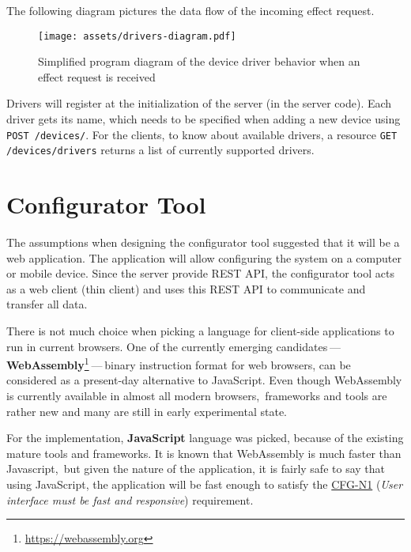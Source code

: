 The following diagram pictures the data flow of the incoming effect request.

\begin{figure}[h]{}
\centering\texttt{[image: assets/drivers-diagram.pdf]}
\caption{Simplified program diagram of the device driver behavior when an effect request is received}
\end{figure}

Drivers will register at the initialization of the server (in the server code).
Each driver gets its name, which needs to be specified when adding a new
device using \texttt{POST /devices/}. For the clients, to know about available
drivers, a resource \texttt{GET /devices/drivers} returns a list
of currently supported drivers.


\hypertarget{x-configurator-tool}{\section{Configurator Tool}}
The assumptions when designing the configurator tool suggested that it will
be a web application. The application will allow configuring the system
on a computer or mobile device. Since the server provide REST API,
the configurator tool acts as a
web client (thin client) and uses this REST API to communicate and transfer
all data.


There is not much choice when picking a language for client-side applications
to run in current browsers. One of the currently
emerging candidates — \textbf{WebAssembly}\footnote{\href{https://webassembly.org}{https://webassembly.org}} — binary instruction format for web browsers, can be considered as
a present-day alternative to JavaScript. Even though WebAssembly is
currently available in almost all modern browsers,\,\cite{wasmroadmap} frameworks
and tools are rather new and many are still in early experimental state.


For the implementation, \textbf{JavaScript} language was picked, because
of the existing mature tools and frameworks. It is known that WebAssembly
is much faster than Javascript,\,\cite{wasmfast} but given the nature of the
application, it is fairly safe to say that using JavaScript, the application
will be fast enough to satisfy the \hyperref[cfg-n1]{CFG-N1}
(\emph{User interface must be fast and responsive})
requirement.


